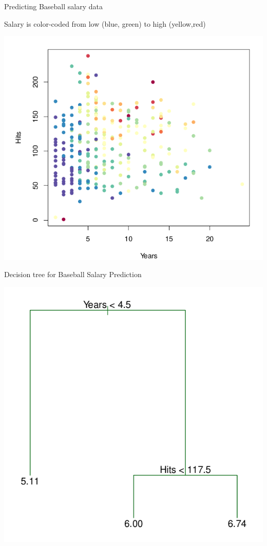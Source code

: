 \documentclass{beamer}
\begin{document}
\begin{frame}{Predicting Baseball salary data}
    
    Salary is color-coded from low (blue, green) to high (yellow,red)
    \begin{center}
        \includegraphics[scale=0.3]{baseballSal1.png}
    \end{center}
\end{frame}
\begin{frame}{Decision tree for Baseball Salary Prediction}
    \begin{center}
        \includegraphics[scale=0.3]{baseballSal2.png}
    \end{center}
\end{frame}
\end{document}
